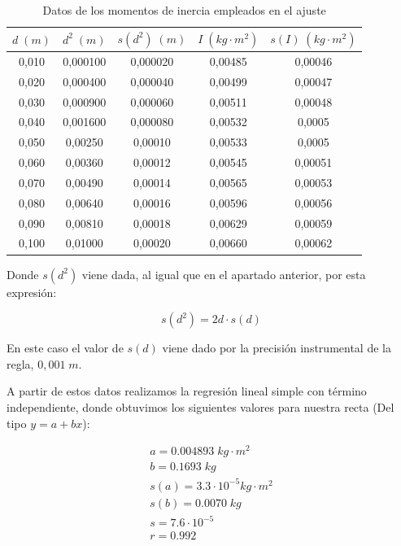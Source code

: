 \documentclass[a4paper,12pt,titlepage]{report}
\begin{document}
\begin{table}[h!]
    \centering
    \begin{tabular}{|c|c|c|c|c|}
    \hline
    $d \; (m)$ & $d^2\; (m)$ & $s(d^2) \; (m)$ & $I\;(kg\cdot m^2)$& $s(I)\;(kg\cdot m^2)$ \\ \hline
    0,010 & 0,000100 & 0,000020 & 0,00485 & 0,00046 \\ \hline
    0,020 & 0,000400 & 0,000040 & 0,00499 & 0,00047 \\ \hline
    0,030 & 0,000900 & 0,000060 & 0,00511 & 0,00048 \\ \hline
    0,040 & 0,001600 & 0,000080 & 0,00532 & 0,0005  \\ \hline
    0,050 & 0,00250 & 0,00010  & 0,00533 & 0,0005  \\ \hline
    0,060 & 0,00360 & 0,00012 & 0,00545 & 0,00051 \\ \hline
    0,070 & 0,00490 & 0,00014 & 0,00565 & 0,00053 \\ \hline
    0,080 & 0,00640 & 0,00016 & 0,00596 & 0,00056 \\ \hline
    0,090 & 0,00810 & 0,00018 & 0,00629 & 0,00059 \\ \hline
    0,100  & 0,01000 & 0,00020  & 0,00660  & 0,00062 \\ \hline
    \end{tabular}
    \caption{Datos de los momentos de inercia empleados en el ajuste}
    \label{Datos steiner 2}
\end{table}


Donde $s(d^2)$ viene dada, al igual que en el apartado anterior, por esta expresión:

\begin{equation}
    s(d^2) = 2d \cdot s(d)
\end{equation}

En este caso el valor de $s(d)$ viene dado por la precisión instrumental de la regla, $0,001 \;m$.

\par A partir de estos datos realizamos la regresión lineal simple con término independiente, donde obtuvimos los siguientes valores para nuestra recta (Del tipo $y=a+bx$):

\begin{equation}
    \begin{gathered}
        a = 0.004893 \; kg \cdot m^2 \\
        b = 0.1693 \; kg \\
        s(a) = 3.3\cdot 10^{-5} kg \cdot m^2 \\
        s(b) = 0.0070 \; kg \\
        s = 7.6 \cdot 10^{-5} \\
        r = 0.992
    \end{gathered}
\end{equation}
\end{document}

